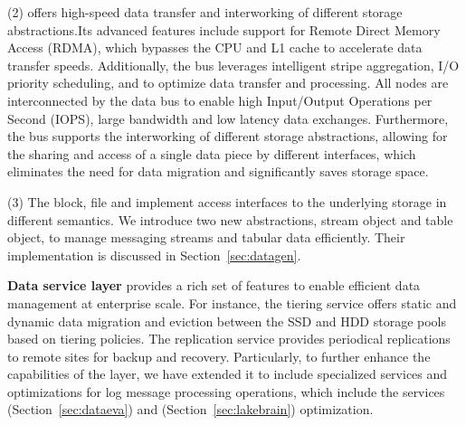

(2)  offers high-speed data transfer and interworking of different storage abstractions.Its advanced features include support for Remote Direct Memory Access (RDMA), which bypasses the CPU and L1 cache to accelerate data transfer speeds. Additionally, the bus leverages intelligent stripe aggregation, I/O priority scheduling, and  to optimize data transfer and processing.
All nodes are interconnected by the data bus to enable high  Input/Output Operations per Second (IOPS), large bandwidth and low latency data exchanges. Furthermore, the bus supports the interworking of different storage abstractions, allowing for the sharing and  access of a single data piece by different interfaces, which eliminates the need for data migration and significantly saves storage space.

(3) The block, file and  implement access interfaces to the underlying storage in different semantics. We introduce two new abstractions, stream object and table object, to manage messaging streams and tabular data efficiently. 
Their implementation is discussed in Section~\ref{sec:datagen}.


\noindent \textbf{Data service layer} provides a rich set of features to enable efficient data management at enterprise scale. For instance, the tiering service offers static and dynamic data migration and eviction between the SSD and HDD storage pools based on tiering policies. The replication service provides periodical replications to remote sites for backup and recovery.
 Particularly, to further enhance the capabilities of the layer, we have extended it to include specialized services and optimizations for log message processing operations, which include the \sys  services (Section~\ref{sec:dataeva}) and \brain (Section~\ref{sec:lakebrain}) optimization.
 

